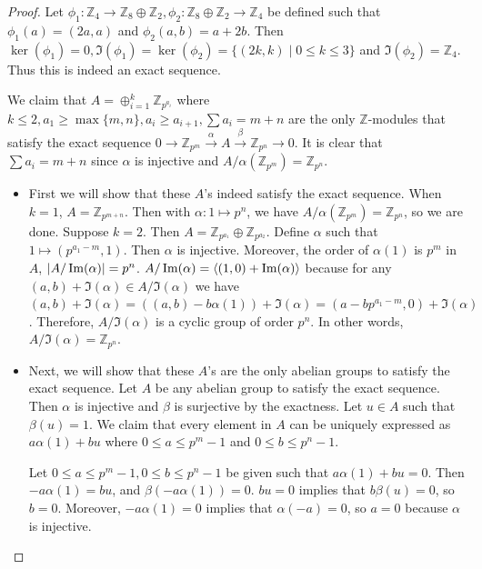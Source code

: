 \documentclass[12pt, psamsfonts]{amsart}
\theoremstyle{definition}
\theoremstyle{remark}
\numberwithin{equation}{section}
\begin{document}
\begin{proof}
  Let $\phi_1: \mathbb{Z}_4 \rightarrow \mathbb{Z}_8 \oplus \mathbb{Z}_2, \phi_2: \mathbb{Z}_8 \oplus \mathbb{Z}_2 \rightarrow \mathbb{Z}_4$ be defined such that $\phi_1(a) = (2a, a)$ and $\phi_2(a, b) = a + 2b$.
  Then $\ker(\phi_1) = 0, \Im(\phi_1) = \ker(\phi_2) = \{ (2k, k) \mid 0 \leq k \leq 3 \}$ and $\Im(\phi_2) = \mathbb{Z}_4$.
  Thus this is indeed an exact sequence.

  We claim that $A = \oplus_{i=1}^{k} \mathbb{Z}_{p^{a_i}}$ where $k \leq 2, a_1 \geq \max\{ m, n \}, a_i \geq a_{i + 1}, \sum a_i = m + n$ are the only $\mathbb{Z}$-modules that satisfy the exact sequence $0 \rightarrow \mathbb{Z}_{p^m} \xrightarrow{\alpha} A \xrightarrow{\beta} \mathbb{Z}_{p^n} \rightarrow 0$. 
  It is clear that $\sum a_i = m + n$ since $\alpha$ is injective and $A / \alpha(\mathbb{Z}_{p^m}) = \mathbb{Z}_{p^n}$.
  \begin{itemize}
    \item
      First we will show that these $A$'s indeed satisfy the exact sequence.
      When $k = 1$, $A = \mathbb{Z}_{p^{m + n}}$.
      Then with $\alpha: 1 \mapsto p^n$, we have $A / \alpha(\mathbb{Z}_{p^m}) = \mathbb{Z}_{p^n}$, so we are done.
      Suppose $k = 2$.
      Then $A = \mathbb{Z}_{p^{a_1}} \oplus \mathbb{Z}_{p^{a_2}}$.
      Define $\alpha$ such that $1 \mapsto (p^{a_1 - m}, 1)$.
      Then $\alpha$ is injective.
      Moreover, the order of $\alpha(1)$ is $p^m$ in $A$, $\abs{A / \Im(\alpha)} = p^n$.
      $A / \Im(\alpha) = \ev{ (1, 0) + \Im(\alpha) }$ because for any $(a, b) + \Im(\alpha) \in A / \Im(\alpha)$ we have $(a, b) + \Im(\alpha) = ((a, b) - b\alpha(1)) + \Im(\alpha) = (a - bp^{a_1 - m}, 0) + \Im(\alpha)$.
      Therefore, $A / \Im(\alpha)$ is a cyclic group of order $p^n$.
      In other words, $A / \Im(\alpha) = \mathbb{Z}_{p^n}$.
    \item
      Next, we will show that these $A$'s are the only abelian groups to satisfy the exact sequence.
      Let $A$ be any abelian group to satisfy the exact sequence.
      Then $\alpha$ is injective and $\beta$ is surjective by the exactness.
      Let $u \in A$ such that $\beta(u) = 1$.
      We claim that every element in $A$ can be uniquely expressed as $a\alpha(1) + bu$ where $0 \leq a \leq p^m - 1$ and $0 \leq b \leq p^n - 1$.

      Let $0 \leq a \leq p^m - 1, 0 \leq b \leq p^n - 1$ be given such that $a\alpha(1) + bu = 0$.
      Then $-a\alpha(1) = bu$, and $\beta(-a\alpha(1)) = 0$.
      $bu = 0$ implies that $b\beta(u) = 0$, so $b = 0$.
      Moreover, $-a\alpha(1) = 0$ implies that $\alpha(-a) = 0$, so $a = 0$ because $\alpha$ is injective.


\end{itemize}
\end{proof}
\end{document}
